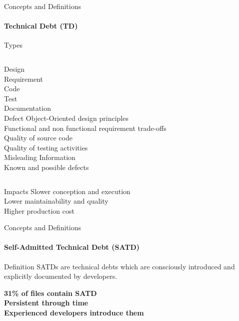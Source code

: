 \documentclass{beamer}
\begin{document}
\begin{darkframes}
				\begin{frame}{Concepts and Definitions}	
					\framesubtitle{Technical Debt (TD)}	
					\begin{exampleblock}{Types}
						\begin{columns}[onlytextwidth]
							\small 
							Design\\
							Requirement\\
							Code\\
							Test\\
							Documentation\\
							Defect
							\small
							\alert{Object-Oriented design principles} \\
							\alert{Functional and non functional requirement trade-offs}\\
							\alert{Quality of source code}\\
							\alert{Quality of testing activities}\\
							\alert{Misleading Information}\\
							\alert{Known and possible defects}
						\end{columns}
					\end{exampleblock}	
					\begin{exampleblock}{Impacts}
						Slower conception and execution\\
						Lower maintainability and quality\\
						Higher production cost
					\end{exampleblock}	
				\end{frame}
			
				\begin{frame}{Concepts and Definitions}	
					\framesubtitle{Self-Admitted Technical Debt (SATD)}	
					\begin{block}{Definition}
						SATDs are technical debts which are consciously introduced and explicitly documented by developers.
					\end{block}
					\begin{framed}
						\centering
						\alert{\textbf{31\% of files contain SATD}}\\
						\alert{\textbf{Persistent through time}}\\
						\alert{\textbf{Experienced developers introduce them}}
					\end{framed}
				\end{frame}
			
						

\end{darkframes}
\end{document}
